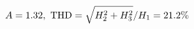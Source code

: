 \documentclass[preview]{standalone}
\begin{document}
\begin{align*}
\special{dvisvgm:raw <g id='unique000'>}A=1.32,\ \text{THD}=\sqrt{H_2^2+H_3^2}/H_1=21.2\%\special{dvisvgm:raw </g>}
\end{align*}
\end{document}
